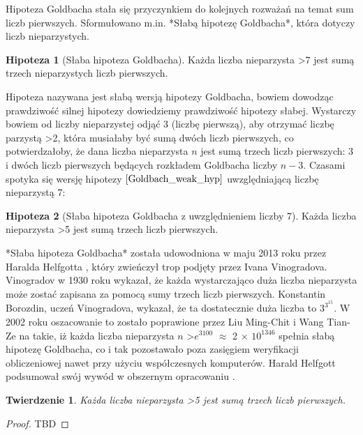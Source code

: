\documentclass[10pt,onecolumn]{article}
\newtheorem{theorem}{Twierdzenie}
\theoremstyle{definition}
\theoremstyle{hypothesis}
\newtheorem{hypothesis}{Hipoteza}
\theoremstyle{capability}
\begin{document}
Hipoteza Goldbacha stała się przyczynkiem do kolejnych rozważań na temat sum liczb pierwszych. Sformułowano m.in. *Słabą hipotezę Goldbacha*, która dotyczy liczb nieparzystych.

\begin{hypothesis}[Słaba hipoteza Goldbacha]
Każda liczba nieparzysta \textgreater 7 jest sumą trzech nieparzystych liczb pierwszych.
\label{Goldbach_weak_hyp}
\end{hypothesis}

Hipoteza nazywana jest słabą wersją hipotezy Goldbacha, bowiem dowodząc prawdziwość silnej hipotezy dowiedziemy prawdziwość hipotezy słabej. Wystarczy bowiem od liczby nieparzystej odjąć 3 (liczbę pierwszą), aby otrzymać liczbę parzystą \textgreater 2, która musiałaby być sumą dwóch liczb pierwszych, co potwierdzałoby, że dana liczba nieparzysta $n$ jest sumą trzech liczb pierwszych: 3 i dwóch liczb pierwszych będących rozkładem Goldbacha liczby $n-3$. Czasami spotyka się wersję hipotezy $\ref{Goldbach_weak_hyp}$ uwzględniającą liczbę nieparzystą 7:

\begin{hypothesis}[Słaba hipoteza Goldbacha z uwzględnieniem liczby 7]
Każda liczba nieparzysta \textgreater 5 jest sumą trzech liczb pierwszych.
\label{Goldbach_weak_hyp_with_seven}
\end{hypothesis}

*Słaba hipoteza Goldbacha* została udowodniona w maju 2013 roku przez Haralda Helfgotta \cite{helfgott2013}, który zwieńczył trop podjęty przez Ivana Vinogradova. Vinogradov w 1930 roku wykazał, że każda wystarczająco duża liczba nieparzysta może zostać zapisana za pomocą sumy trzech liczb pierwszych. Konstantin Borozdin, uczeń Vinogradova, wykazał, że ta dostatecznie duża liczba to $3^{3^{15}}$. W 2002 roku oszacowanie to zostało poprawione przez Liu Ming-Chit i Wang Tian-Ze na takie, iż każda liczba nieparzysta $n$ \textgreater $e^{3100}$  $\approx$ 2 $\times$ $10^{1346}$ spełnia słabą hipotezę Goldbacha, co i tak pozostawało poza zasięgiem weryfikacji obliczeniowej nawet przy użyciu współczesnych komputerów. Harald Helfgott podsumował swój wywód w obszernym opracowaniu \cite{helfgott2015}.

\begin{theorem}
Każda liczba nieparzysta \textgreater 5 jest sumą trzech liczb pierwszych.
\end{theorem}
\begin{proof}
TBD
\end{proof}
\end{document}
